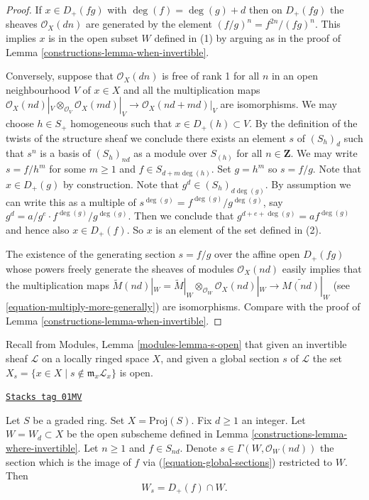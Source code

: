 \begin{proof}

If $x \in D_{+}(fg)$ with $\deg(f) = \deg(g) + d$ then
on $D_{+}(fg)$ the sheaves $\mathcal{O}_X(dn)$
are generated by the element $(f/g)^n = f^{2n}/(fg)^n$. This implies $x$
is in the open subset $W$ defined in (1) by arguing as in the
proof of Lemma \ref{constructions-lemma-when-invertible}.

\medskip\noindent
Conversely, suppose that $\mathcal{O}_X(dn)$ is free of rank 1
for all $n$ in an open neighbourhood $V$ of $x \in X$ and all the
multiplication maps
$\mathcal{O}_X(nd)|_V \otimes_{\mathcal{O}_V} \mathcal{O}_X(md)|_V
\to \mathcal{O}_X(nd + md)|_V$ are isomorphisms.
We may choose $h \in S_{+}$ homogeneous such that $x \in D_{+}(h) \subset V$.
By the definition of the twists of the structure sheaf we conclude there
exists an element $s$ of $(S_h)_d$ such that $s^n$ is a basis of $(S_h)_{nd}$
as a module over $S_{(h)}$ for all $n \in \mathbf{Z}$.
We may write
$s = f/h^m$ for some $m \geq 1$ and $f \in S_{d + m \deg(h)}$.
Set $g = h^m$ so $s = f/g$. Note that $x \in D_{+}(g)$ by construction.
Note that $g^d \in (S_h)_{d\deg(g)}$.
By assumption we can write this as a multiple of
$s^{\deg(g)} = f^{\deg(g)}/g^{\deg(g)}$, say
$g^d = a/g^e \cdot f^{\deg(g)}/g^{\deg(g)}$.
Then we conclude that $g^{d + e + \deg(g)} = a f^{\deg(g)}$
and hence also $x \in D_{+}(f)$. So $x$ is an element of the set defined
in (2).

\medskip\noindent
The existence of the generating section $s = f/g$ over
the affine open $D_{+}(fg)$ whose
powers freely generate the sheaves of modules
$\mathcal{O}_X(nd)$ easily implies that the multiplication maps
$\widetilde M(nd)|_W = \widetilde M|_W \otimes_{\mathcal{O}_W}
\mathcal{O}_X(nd)|_W \to \widetilde{M(nd)}|_W$
(see \ref{equation-multiply-more-generally})
are isomorphisms. Compare with the proof of Lemma \ref{constructions-lemma-when-invertible}.
\end{proof}

Recall from Modules, Lemma \ref{modules-lemma-s-open}
that given an invertible sheaf $\mathcal{L}$ on a locally ringed
space $X$, and given a global section $s$ of $\mathcal{L}$
the set $X_s = \{x \in X \mid s \not \in \mathfrak m_x\mathcal{L}_x\}$
is open.

\begin{lemma}
\label{constructions-lemma-principal-open}
\href{https://stacks.math.columbia.edu/tag/01MV}{\texttt{Stacks tag 01MV}}

Let $S$ be a graded ring. Set $X = \text{Proj}(S)$. Fix $d \geq 1$ an
integer. Let $W = W_d \subset X$ be the open subscheme defined in
Lemma \ref{constructions-lemma-where-invertible}. Let $n \geq 1$ and $f \in S_{nd}$.
Denote $s \in \Gamma(W, \mathcal{O}_W(nd))$ the section which is
the image of $f$ via (\ref{equation-global-sections}) restricted to $W$. Then
$$
W_s = D_{+}(f) \cap W.
$$
\end{lemma}

